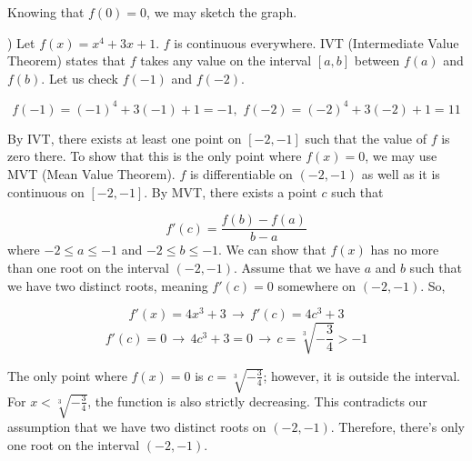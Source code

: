 \documentclass{article}
\begin{document}
\hfill

\noindent Knowing that $f(0) = 0$, we may sketch the graph.

\begin{center}
\end{center}

\hfill

) Let $f(x) = x^4 +3x+1$. $f$ is continuous everywhere. IVT (Intermediate Value Theorem) states that $f$ takes any value on the interval $[a, b]$ between $f(a)$ and $f(b)$. Let us check $f(-1)$ and $f(-2)$.

\begin{equation*} f(-1) = (-1)^4 + 3(-1) + 1 = -1,\,\, f(-2) = (-2)^4 + 3(-2) + 1 = 11\end{equation*}

\hfill

\noindent By IVT, there exists at least one point on $[-2, -1]$ such that the value of $f$ is zero there. To show that this is the only point where $f(x) = 0$, we may use MVT (Mean Value Theorem). $f$ is differentiable on $(-2, -1)$ as well as it is continuous on $[-2, -1]$. By MVT, there exists a point $c$ such that

\begin{equation*} f'(c) = \frac{f(b) - f(a)}{b-a}\end{equation*} where $-2 \leq a \leq -1$ and $-2 \leq b \leq -1$. We can show that $f(x)$ has no more than one root on the interval $(-2, -1)$. Assume that we have $a$ and $b$ such that we have two distinct roots, meaning $f'(c) = 0$ somewhere on $(-2, -1)$. So,

\begin{equation*} f'(x) = 4x^3 + 3\,\rightarrow\,f'(c) = 4c^3+3\end{equation*}
\begin{equation*} f'(c) = 0\,\rightarrow\, 4c^3+3 = 0\,\rightarrow\,  c = \sqrt[3]{-\frac{3}{4}} > -1 \end{equation*}

\noindent The only point where $f(x) = 0$ is $c=\sqrt[3]{-\frac{3}{4}}$; however, it is outside the interval. For $x < \sqrt[3]{-\frac{3}{4}}$, the function is also strictly decreasing. This contradicts our assumption that we have two distinct roots on $(-2, -1)$. Therefore, there's only one root on the interval $(-2, -1)$.
\end{document}

